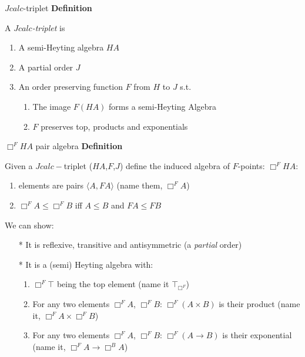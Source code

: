\documentclass{beamer}
\begin{document}
 \begin{frame}{$Jcalc$-triplet}
  \textbf{Definition}
  
    A \emph{$Jcalc$-triplet} is 
    
  \begin{enumerate}
  \item A semi-Heyting algebra $HA$
  \item A partial order $J$
  \item An order preserving function $F$ from $H$ to $J$ s.t.
  \begin{enumerate}
    \item The image $F(HA)$ forms a semi-Heyting Algebra
    \item $F$ preserves top, products and exponentials
  \end{enumerate}
  \end{enumerate}
\end{frame}
\begin{frame}{$\Box^F HA$ pair algebra}
  \textbf{Definition}
  
Given a $Jcalc-$triplet ($HA$,$F$,$J$)  define the induced algebra of $F$-points:
$\Box^F HA$:
\begin{enumerate}
\item elements are pairs  $\langle A,FA\rangle$ (name them, $\Box^F A$)
\item $\Box^F A\le \Box^F B$ iff $ A\le B$ and $FA\le FB$ 
\end{enumerate}
We can show:
\begin{itemize}
  \item[*] It is reflexive, transitive and antisymmetric (a \textit{partial} order)
  \item[*] It is a (semi) Heyting algebra with:
  \begin{enumerate}
    \item $\Box^F \top$ being the top element (name it $\top_{\Box^F}$)
    \item For any two elements $\Box^F A$, $\Box^F B$: 
    $\Box^F (A\times B)$ is their product (name it, $\Box^{F} A\times\Box^{F} B$)
    \item For any two elements $\Box^F A$, $\Box^F B$:
    $\Box^F (A\rightarrow B)$ is their exponential 
    (name it, $\Box^F A\rightarrow\Box^B A$)
  \end{enumerate}
\end{itemize}
\end{frame}
\end{document}
